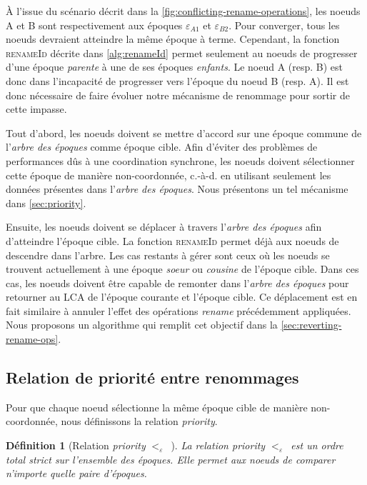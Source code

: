 \documentclass[12pt]{thesul}
\newtheorem{definition}{Définition}
\newcommand{\ie}{c.-à-d. }
\newcommand{\epoch}[1]{$\varepsilon_{#1}$}
\newcommand{\lepoch}{$<_{\varepsilon}$~}
\begin{document}
À l'issue du scénario décrit dans la \autoref{fig:conflicting-rename-operations}, les noeuds A et B sont respectivement aux époques \epoch{A1} et \epoch{B2}.
Pour converger, tous les noeuds devraient atteindre la même époque à terme.
Cependant, la fonction \textsc{renameId} décrite dans \autoref{alg:renameId} permet seulement au noeuds de progresser d'une époque \emph{parente} à une de ses époques \emph{enfants}.
Le noeud A (resp. B) est donc dans l'incapacité de progresser vers l'époque du noeud B (resp. A).
Il est donc nécessaire de faire évoluer notre mécanisme de renommage pour sortir de cette impasse.

Tout d'abord, les noeuds doivent se mettre d'accord sur une époque commune de l'\emph{arbre des époques} comme époque cible.
Afin d'éviter des problèmes de performances dûs à une coordination synchrone, les noeuds doivent sélectionner cette époque de manière non-coordonnée, \ie en utilisant seulement les données présentes dans l'\emph{arbre des époques}.
Nous présentons un tel mécanisme dans \autoref{sec:priority}.

Ensuite, les noeuds doivent se déplacer à travers l'\emph{arbre des époques} afin d'atteindre l'époque cible.
La fonction \textsc{renameId} permet déjà aux noeuds de descendre dans l'arbre.
Les cas restants à gérer sont ceux où les noeuds se trouvent actuellement à une époque \emph{soeur} ou \emph{cousine} de l'époque cible.
Dans ces cas, les noeuds doivent être capable de remonter dans l'\emph{arbre des époques} pour retourner au \ac{LCA} de l'époque courante et l'époque cible.
Ce déplacement est en fait similaire à annuler l'effet des opérations \emph{rename} précédemment appliquées.
Nous proposons un algorithme qui remplit cet objectif dans la \autoref{sec:reverting-rename-ops}.

\subsection{Relation de priorité entre renommages}

\label{sec:priority}

Pour que chaque noeud sélectionne la même époque cible de manière non-coordonnée, nous définissons la relation \emph{priority}.

\begin{definition}[Relation \emph{priority} \lepoch]
  La relation \emph{priority} \lepoch est un ordre total strict sur l'ensemble des époques.
  Elle permet aux noeuds de comparer n'importe quelle paire d'époques.
\end{definition}
\end{document}
